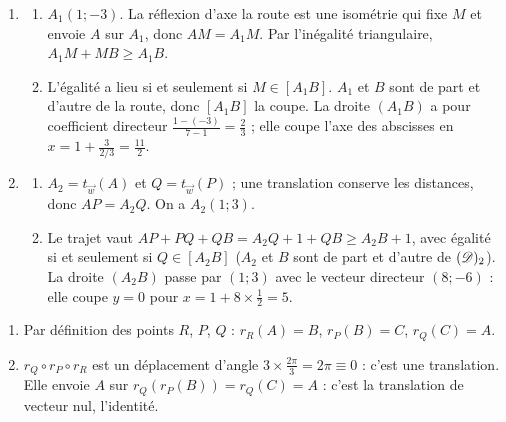 \begin{corrige}
\begin{sol}
\begin{enumerate}
      \item \begin{enumerate}
                  \item $A_1(1;-3)$. La réflexion d'axe la route est une isométrie qui fixe $M$ et envoie $A$ sur $A_1$, donc $AM = A_1M$.
                        Par l'inégalité triangulaire, $A_1M + MB \geq A_1B$.
                  \item L'égalité a lieu si et seulement si $M \in [A_1B]$. $A_1$ et $B$ sont de part et d'autre de la route, donc $[A_1B]$ la coupe.
                        La droite $(A_1B)$ a pour coefficient directeur $\frac{1-(-3)}{7-1} = \frac23$ ; elle coupe l'axe des abscisses en
                        $x = 1 + \frac{3}{2/3} = \frac{11}{2}$. 
            \end{enumerate}
      \item \begin{enumerate}
                  \item $A_2 = t_{\vec{w}}(A)$ et $Q = t_{\vec{w}}(P)$ ; une translation conserve les distances, donc $AP = A_2Q$. On a $A_2(1;3)$.
                  \item Le trajet vaut $AP + PQ + QB = A_2Q + 1 + QB \geq A_2B + 1$, avec égalité si et seulement si $Q \in [A_2B]$
                        ($A_2$ et $B$ sont de part et d'autre de $(\mathscr{D})_2$).
                        La droite $(A_2B)$ passe par $(1;3)$ avec le vecteur directeur $(8;-6)$ : elle coupe $y = 0$ pour $x = 1 + 8 \times \frac12 = 5$.
            \end{enumerate}
\end{enumerate}
\end{sol}
\begin{sol}
\begin{enumerate}
      \item Par définition des points $R$, $P$, $Q$ : $r_R(A) = B$, $r_P(B) = C$, $r_Q(C) = A$.
      \item $r_Q \circ r_P \circ r_R$ est un déplacement d'angle $3 \times \frac{2\pi}{3} = 2\pi \equiv 0$ : c'est une translation.
            Elle envoie $A$ sur $r_Q(r_P(B)) = r_Q(C) = A$ : c'est la translation de vecteur nul, l'identité.

\end{enumerate}
\end{sol}
\end{corrige}
